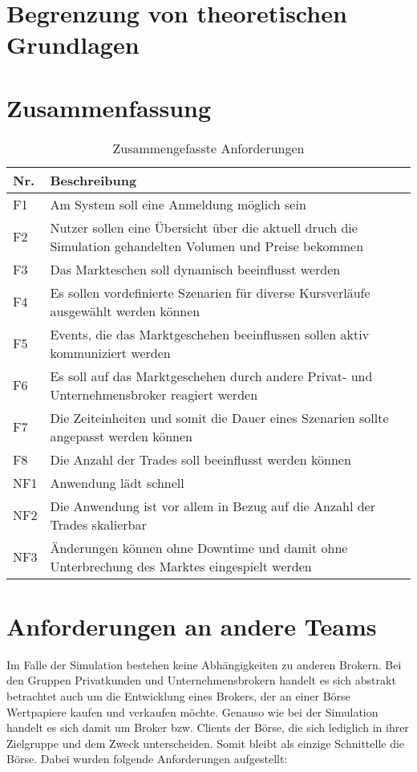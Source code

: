 \section{Begrenzung von theoretischen Grundlagen}
\section{Zusammenfassung}
	\begin{table}[ht!]
		\centering
		\begin{tabularx}{.8\textwidth}{l|X}
			Nr.     & Beschreibung                              \\\hline
			F1      & Am System soll eine Anmeldung möglich sein                  \\
			F2      & Nutzer sollen eine Übersicht über die aktuell druch die Simulation gehandelten Volumen und Preise bekommen  \\
			F3      & Das Markteschen soll dynamisch beeinflusst werden   \\
			F4      & Es sollen vordefinierte Szenarien für diverse Kursverläufe ausgewählt werden können \\
			F5      & Events, die das Marktgeschehen beeinflussen sollen aktiv kommuniziert werden  \\
			F6      & Es soll auf das Marktgeschehen durch andere Privat- und Unternehmensbroker reagiert werden  \\
			F7      & Die Zeiteinheiten und somit die Dauer eines Szenarien sollte angepasst werden können  \\
			F8		& Die Anzahl der Trades soll beeinflusst werden können \\\hline
			NF1     & Anwendung lädt schnell                    \\
			NF2     & Die Anwendung ist vor allem in Bezug auf die Anzahl der Trades skalierbar                \\
			NF3     & Änderungen können ohne Downtime und damit ohne Unterbrechung des Marktes eingespielt werden   \\
		\end{tabularx}
		\caption{Zusammengefasste Anforderungen}
		\label{tab:anforderungen}
	\end{table}

\section{Anforderungen an andere Teams}
	Im Falle der Simulation bestehen keine Abhängigkeiten zu anderen Brokern. Bei den Gruppen Privatkunden und Unternehmensbrokern handelt es sich abstrakt betrachtet auch um die Entwicklung eines Brokers, der an einer Börse Wertpapiere kaufen und verkaufen möchte. Genauso wie bei der Simulation handelt es sich damit um Broker bzw. Clients der Börse, die sich lediglich in ihrer Zielgruppe und dem Zweck unterscheiden. Somit bleibt als einzige Schnittelle die Börse. Dabei wurden folgende Anforderungen aufgestellt:
	
